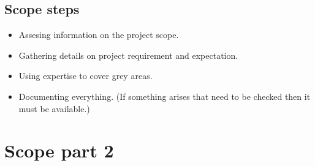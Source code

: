 \subsection{Scope steps}
\begin{itemize}
    \item Assesing information on the project scope.
    \item Gathering details on project requirement and expectation.
    \item Using expertise to cover grey areas.
    \item Documenting everything. (If something arises that need to be checked then it must be available.)
\end{itemize}

\section{Scope part 2}
